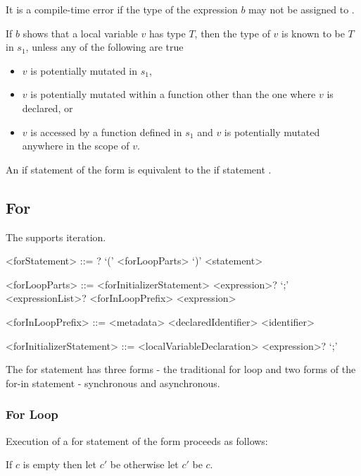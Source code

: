 \documentclass[makeidx]{article}
\begin{document}
{\LMHash{}%
It is a compile-time error if the type of the expression $b$
may not be assigned to .

\LMHash{}%
If $b$ shows that a local variable $v$ has type $T$,
then the type of $v$ is known to be $T$ in $s_1$,
unless any of the following are true

\begin{itemize}
\item $v$ is potentially mutated in $s_1$,
\item $v$ is potentially mutated within a function other
  than the one where $v$ is declared, or
\item $v$ is accessed by a function defined in $s_1$ and
  $v$ is potentially mutated anywhere in the scope of $v$.
\end{itemize}

\LMHash{}%
An if statement of the form  is equivalent to
the if statement .


\subsection{For}

\LMHash{}%
The  supports iteration.

\begin{grammar}
<forStatement> ::= \AWAIT? \FOR{} `(' <forLoopParts> `)' <statement>

<forLoopParts> ::= <forInitializerStatement> <expression>? `;' <expressionList>?
  \alt <forInLoopPrefix> \IN{} <expression>

<forInLoopPrefix> ::= <metadata> <declaredIdentifier>
  \alt <identifier>

<forInitializerStatement> ::= <localVariableDeclaration>
  \alt <expression>? `;'
\end{grammar}

\LMHash{}%
The for statement has three forms - the traditional for loop
and two forms of the for-in statement - synchronous and asynchronous.


\subsubsection{For Loop}

\LMHash{}%
Execution of a for statement of the form
 proceeds as follows:

\LMHash{}%
If $c$ is empty then let $c'$ be \TRUE{} otherwise let $c'$ be $c$.

}
\end{document}
